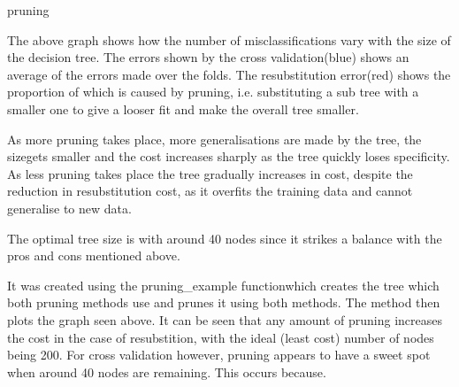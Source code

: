 pruning

The above graph shows how the number of misclassifications vary with the size of the decision tree. The errors shown by the cross validation(blue) shows an average of the errors made over the folds. The resubstitution error(red) shows the proportion of which is caused by pruning, i.e. substituting a sub tree with a smaller one to give a looser fit and make the overall tree smaller.

As more pruning takes place, more generalisations are made by the tree, the sizegets smaller and the cost increases sharply as the tree quickly loses specificity. As less pruning takes place the tree gradually increases in cost, despite the reduction in resubstitution cost, as it overfits the training data and cannot generalise to new data.

The optimal tree size is with around 40 nodes since it strikes a balance with the pros and cons mentioned above.


It was created using the pruning_example functionwhich creates the tree which both pruning methods use and prunes it using both methods. The method then plots the graph seen above. It can be seen that any amount of pruning increases the cost in the case of resubstition, with the ideal (least cost) number of nodes being 200. For cross validation however, pruning appears to have a sweet spot when around 40 nodes are remaining. This occurs because. 
